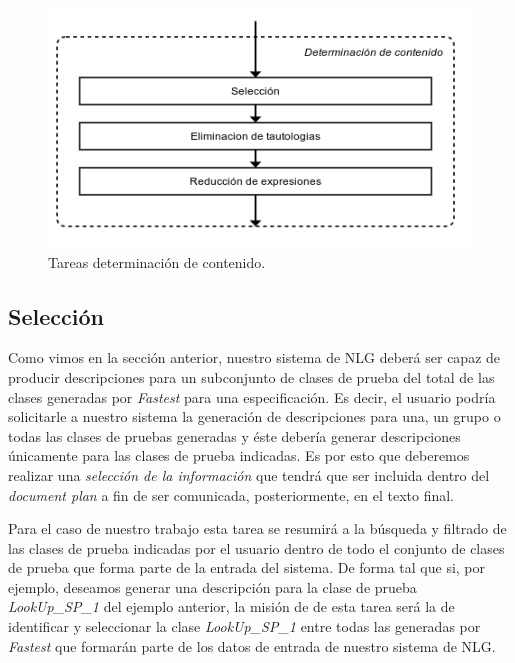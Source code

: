 \begin{figure}[H]
  	\centering
	\includegraphics[scale=0.4]{img/tareas_determinacion_contenido.png}
	\caption{Tareas determinación de contenido.}
  	\label{fig:tareas_determinacion_contenido}
\end{figure}

\subsection*{Selección}
Como vimos en la sección anterior, nuestro sistema de NLG deberá ser capaz de producir descripciones para un subconjunto de clases de prueba del total de las clases generadas por \emph{Fastest} para una especificación. Es decir, el usuario podría solicitarle a nuestro sistema la generación de descripciones para una, un grupo o todas las clases de pruebas generadas y éste debería generar descripciones únicamente para las clases de prueba indicadas. Es por esto que deberemos realizar una \emph{selección de la información} que tendrá que ser incluida dentro del \textit{document plan} a fin de ser comunicada, posteriormente, en el texto final.

Para el caso de nuestro trabajo esta tarea se resumirá a la búsqueda y filtrado de las clases de prueba indicadas por el usuario dentro de todo el conjunto de clases de prueba que forma parte de la entrada del sistema. De forma tal que si, por ejemplo, deseamos generar una descripción para la clase de prueba \emph{LookUp\_SP\_1} del ejemplo anterior, la misión de de esta tarea será la de identificar y seleccionar la clase \emph{LookUp\_SP\_1} entre todas las generadas por \emph{Fastest} que formarán parte de los datos de entrada de nuestro sistema de NLG.


